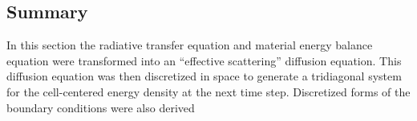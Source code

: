 \belowSubSecSkip

\subsection{Summary}
\label{sec:Transport-Summary}

\noindent
	\indent In this section the radiative transfer equation and material energy balance equation were transformed into an ``effective scattering'' diffusion equation. This diffusion equation was then discretized in space to generate a tridiagonal system for the cell-centered energy density at the next time step. Discretized forms of the boundary conditions were also derived

